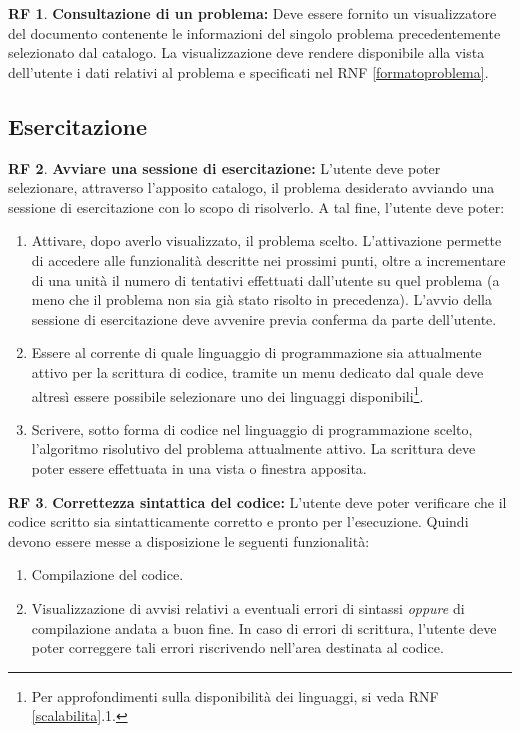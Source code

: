 \documentclass[11pt, a4paper]{article}
\theoremstyle{definition}
\newtheorem{funcreq}{RF} %
\begin{document}
\begin{funcreq}
\label{seeproblem}
\textbf{Consultazione di un problema:}
Deve essere fornito un visualizzatore del documento contenente le
informazioni del singolo problema precedentemente selezionato dal
catalogo. La visualizzazione deve rendere disponibile alla vista
dell'utente i dati relativi al problema e specificati nel RNF
\ref{formatoproblema}.
\end{funcreq}

\subsection{Esercitazione}
\begin{funcreq}
\textbf{Avviare una sessione di esercitazione:}
L'utente deve poter selezionare, attraverso l'apposito catalogo, il
problema desiderato avviando una sessione di esercitazione con lo scopo
di risolverlo. A tal fine, l'utente deve poter:
\begin{enumerate}
    \item Attivare, dopo averlo visualizzato, il problema scelto. L'attivazione permette di accedere alle funzionalità descritte nei prossimi punti, oltre a incrementare di una unità il numero di tentativi
    effettuati dall'utente su quel problema (a meno che il problema non
    sia già stato risolto in precedenza). L'avvio della sessione di
    esercitazione deve avvenire previa conferma da parte dell'utente.
    
    \item Essere al corrente di quale linguaggio di programmazione sia
    attualmente attivo per la scrittura di codice, tramite un menu dedicato
    dal quale deve altresì essere possibile selezionare uno dei linguaggi
    disponibili\footnote{Per approfondimenti sulla disponibilità dei linguaggi, si veda RNF \ref{scalabilita}.1.}.
    
    \item Scrivere, sotto forma di codice nel linguaggio di programmazione
    scelto, l'algoritmo risolutivo del problema attualmente attivo. La
    scrittura deve poter essere effettuata in una vista o finestra apposita.
\end{enumerate}
\end{funcreq}

\begin{funcreq}
\textbf{Correttezza sintattica del codice:}
L'utente deve poter verificare che il codice scritto sia sintatticamente
corretto e pronto per l'esecuzione. Quindi devono essere messe a disposizione
le seguenti funzionalità:
\begin{enumerate}
    \item Compilazione del codice.
    \item Visualizzazione di avvisi relativi a eventuali errori di sintassi
    \textit{oppure} di compilazione andata a buon fine. In caso di errori
    di scrittura, l'utente deve poter correggere tali errori riscrivendo
    nell'area destinata al codice.
\end{enumerate}
\end{funcreq}
\end{document}

